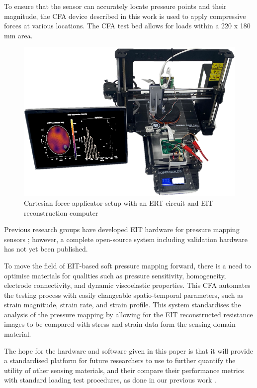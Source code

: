 To ensure that the sensor can accurately locate pressure points and their magnitude, the CFA device described in this work is used to apply compressive forces at various locations. The CFA test bed allows for loads within a 220 x 180 mm area.
\begin{figure}[H]
\centering
\includegraphics[width=0.5\linewidth]{Figures/cfa_screen_pic.png}
\caption{Cartesian force applicator setup with an ERT circuit and EIT reconstruction computer}
\label{fig:cfa_setup}
\end{figure} 
Previous research groups have developed EIT hardware for pressure mapping sensors \cite{Chen2023,Zhang2017b,Visentin2016,Yoon2017,Sun2020}; however, a complete open-source system including validation hardware has not yet been published. 

To move the field of EIT-based soft pressure mapping forward, there is a need to optimise materials for qualities such as pressure sensitivity, homogeneity, electrode connectivity, and dynamic viscoelastic properties.
This CFA automates the testing process with easily changeable spatio-temporal parameters, such as strain magnitude, strain rate, and strain profile. This system standardises the analysis of the pressure mapping by allowing for the EIT reconstructed resistance images to be compared with stress and strain data form the sensing domain material.

The hope for the hardware and software given in this paper is that it will provide a standardised platform for future researchers to use to further quantify the utility of other sensing materials, and their compare their performance metrics with standard loading test procedures, as done in our previous work \cite{Ellingham2024}.

